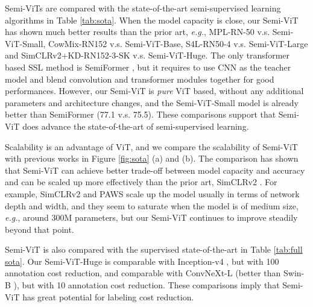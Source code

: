 \documentclass{article}
\newcommand\eg{\emph{e.g.}}
\begin{document}
Semi-ViTs are compared with the state-of-the-art semi-supervised learning algorithms in Table \ref{tab:sota}. When the model capacity is close, our Semi-ViT has shown much better results than the prior art, \eg, MPL-RN-50 \cite{DBLP:conf/cvpr/PhamDXL21} v.s. Semi-ViT-Small, CowMix-RN152 \cite{DBLP:conf/visapp/FrenchOS22} v.s. Semi-ViT-Base, S4L-RN50-4 \cite{DBLP:conf/iccv/BeyerZOK19} v.s. Semi-ViT-Large and SimCLRv2+KD-RN152-3-SK \cite{DBLP:conf/nips/ChenKSNH20} v.s. Semi-ViT-Huge. The only transformer based SSL method is SemiFormer \cite{weng2021semi}, but it requires to use CNN as the teacher model and blend convolution and transformer modules together for good performances. However, our Semi-ViT is \emph{pure} ViT based, without any additional parameters and architecture changes, and the Semi-ViT-Small model is already better than SemiFormer (77.1 v.s. 75.5). These comparisons support that Semi-ViT does advance the state-of-the-art of semi-supervised learning.

Scalability is an advantage of ViT, and we compare the scalability of Semi-ViT with previous works in Figure \ref{fig:sota} (a) and (b). The comparison has shown that Semi-ViT can achieve better trade-off between model capacity and accuracy and can be scaled up more effectively than the prior art, SimCLRv2 \cite{DBLP:conf/nips/ChenKSNH20}. For example, SimCLRv2 and PAWS \cite{DBLP:conf/iccv/AssranCMBJBR21} scale up the model usually in terms of network depth and width, and they seem to saturate when the model is of medium size, \eg, around 300M parameters, but our Semi-ViT continues to improve steadily beyond that point. 

Semi-ViT is also compared with the supervised state-of-the-art in Table \ref{tab:full sota}. Our Semi-ViT-Huge is comparable with Inception-v4 \cite{DBLP:conf/aaai/SzegedyIVA17}, but with 100 annotation cost reduction, and comparable with ConvNeXt-L \cite{liu2022convnet} (better than Swin-B \cite{DBLP:conf/iccv/LiuL00W0LG21}), but with 10 annotation cost reduction. These comparisons imply that Semi-ViT has great potential for labeling cost reduction.
\end{document}
